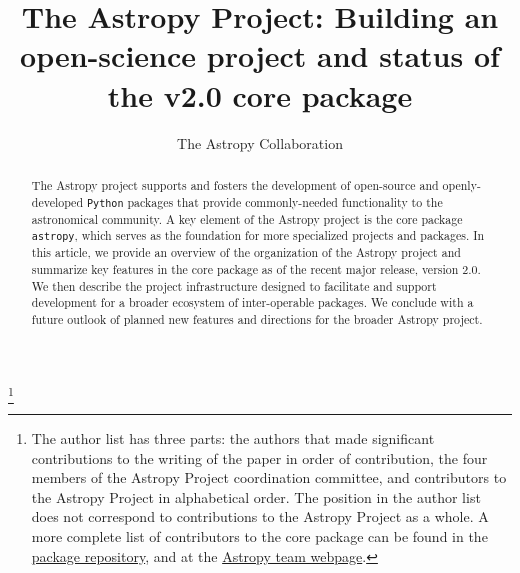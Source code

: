 \documentclass[modern]{aastex62}
\newcommand{\package}[1]{\texttt{#1}\xspace}
\newcommand{\python}{\package{Python}}
\newcommand{\astropy}{Astropy\xspace}
\newcommand{\astropypkg}{\package{astropy}}
\begin{document}
\draft{\today}

\title{The Astropy Project: Building an open-science project and status of the v2.0 core package}


\author{The Astropy Collaboration}
\noaffiliation
{\let\thefootnote\relax\footnote{{The author list has three parts: the authors that made significant contributions to the writing of the paper in order of contribution, the four members of the \astropy Project coordination committee, and contributors to the \astropy Project in alphabetical order. The position in the author list does not correspond to contributions to the \astropy Project as a whole. A more complete list of contributors to the core package can be found in the \href{https://github.com/astropy/astropy/graphs/contributors}{package repository}, and at the \href{http://www.astropy.org/team.html}{\astropy team webpage}.}}}



\begin{abstract}
The \astropy project supports and fosters the development of open-source and openly-developed
\python packages that provide commonly-needed functionality to the astronomical
community.
A key element of the \astropy project is the core package \astropypkg, which serves as the
foundation for more specialized projects and packages.
In this article, we provide an overview of the organization of the \astropy
project and summarize key features in the core package as of the recent major
release, version 2.0.
We then describe the project infrastructure designed to facilitate and support
development for a broader ecosystem of inter-operable packages.
We conclude with a future outlook of planned new features and directions for the
broader \astropy project.
\end{abstract}

\end{document}
